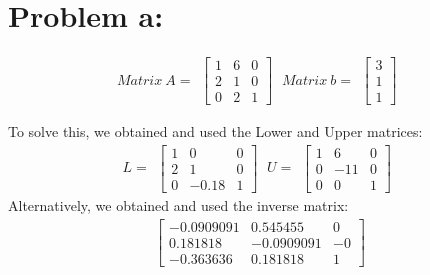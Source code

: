 \documentclass[a4paper, 10pt]{article}
\begin{document}

\section{Problem a:}
\begin{equation*}
Matrix \ A =
\begin{matrix}
	\begin{bmatrix}
	1 & 6 & 0 \\ 2 & 1 & 0 \\ 0 & 2 & 1 
	\end{bmatrix}
\end{matrix}
\ Matrix \ b =
\begin{matrix}
	\begin{bmatrix}
	3 \\ 1 \\ 1 
	\end{bmatrix}
\end{matrix}
\end{equation*}

\noindent To solve this, we obtained and used the Lower and Upper matrices:
\begin{equation*}
L =
\begin{matrix}
	\begin{bmatrix}
	1 & 0 & 0 \\ 2 & 1 & 0 \\ 0 & -0.18 & 1 
	\end{bmatrix}
\end{matrix}
\ U =
\begin{matrix}
	\begin{bmatrix}
	1 & 6 & 0 \\ 0 & -11 & 0 \\ 0 & 0 & 1
	\end{bmatrix}
\end{matrix}
\end{equation*}
Alternatively, we obtained and used the inverse matrix:
\begin{equation*}
\begin{matrix}
	\begin{bmatrix}
	-0.0909091 & 0.545455 & 0\\	
	0.181818 & -0.0909091 & -0\\	
	-0.363636 &	0.181818 & 1
	\end{bmatrix}
\end{matrix}
\end{equation*}
\end{document}

